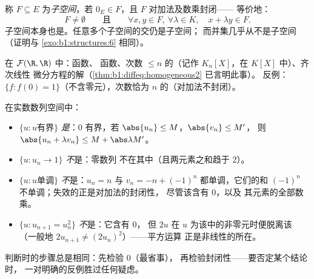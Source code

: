 \begin{definition}[子空间]\label{def:b1:vspaces:subspace}
称 $F \subseteq E$ 为\emph{子空间}，若 $0_E \in
F$，且 $F$ 对加法及数乘封闭——
等价地：
\[
F \neq \emptyset
\qquad\text{且}\qquad
\forall x, y \in F,\ \forall \lambda \in K,\quad
x + \lambda y \in F .
\]
子空间本身也是。任意多个子空间的交仍是子空间；
而并集几乎从不是子空间（证明与
\cref{exo:b1:structures:6} 相同）。
\end{definition}

\begin{example}\label{ex:b1:vspaces:subspaces}
在 $\mathcal{F}(\R, \R)$ 中：函数、
函数、次数 $\leq n$ 的（记作
$K_n[X]$，在 $K[X]$ 中）、齐次线性
微分方程的解（\cref{thm:b1:diffeq:homogeneous2} 已言明此事）。
反例：$\{f : f(0) = 1\}$（不含零元），次数恰为
$n$ 的（对加法不封闭）。
\end{example}

\begin{example}
\label{ex:b1:vspaces:subspaceornot}
在实数数列空间中：
\begin{itemize}
  \item $\{u : u \text{有界}\}$ \emph{是}：$0$
        有界，若 $\abs{u_n} \leq M$，$\abs{v_n} \leq M'$，
        则 $\abs{u_n + \lambda v_n} \leq M + \abs\lambda M'$。
  \item $\{u : u_n \to 1\}$ \emph{不}是：零数列
        不在其中（且两元素之和趋于 $2$）。
  \item $\{u : u \text{单调}\}$ \emph{不}是：$u_n = n$
        与 $v_n = -n + (-1)^n$ 都单调，它们的和
        $(-1)^n$ 不单调；失效的正是对加法的封闭性，
        尽管该含有 $0$，以及
        其元素的全部数乘。
  \item $\{u : u_{n+1} = u_n^2\}$ \emph{不}是：它含有 $0$，
        但 $2u$ 在 $u$ 为该中的非零元时便脱离该
        （一般地 $2u_{n+1} \neq (2u_n)^2$）——平方运算
        正是非线性的所在。
\end{itemize}
判断时的步骤总是相同：先检验 $0$（最省事），
再检验封闭性——要否定某个结论时，
一对明确的反例胜过任何疑虑。
\end{example}

